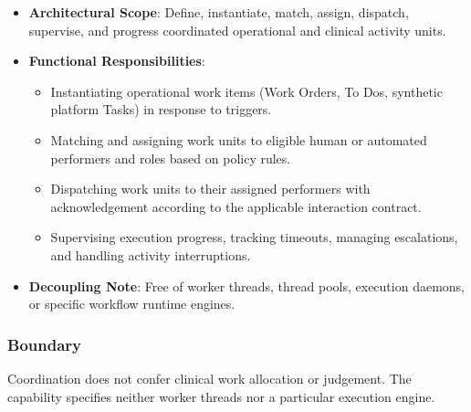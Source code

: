 \begin{itemize}

\item
\textbf{Architectural Scope}: Define, instantiate, match, assign, dispatch, supervise, and progress coordinated operational and clinical activity units.



\item
\textbf{Functional Responsibilities}:


\begin{itemize}

\item
Instantiating operational work items (Work Orders, To Dos, synthetic platform Tasks) in response to triggers.



\item
Matching and assigning work units to eligible human or automated performers and roles based on policy rules.



\item
Dispatching work units to their assigned performers with acknowledgement according to the applicable interaction contract.



\item
Supervising execution progress, tracking timeouts, managing escalations, and handling activity interruptions.



\end{itemize}


\item
\textbf{Decoupling Note}: Free of worker threads, thread pools, execution daemons, or specific workflow runtime engines.



\end{itemize}
\subsubsection*{Boundary}

Coordination does not confer clinical work allocation or judgement. The capability specifies neither worker threads nor a particular execution engine.

